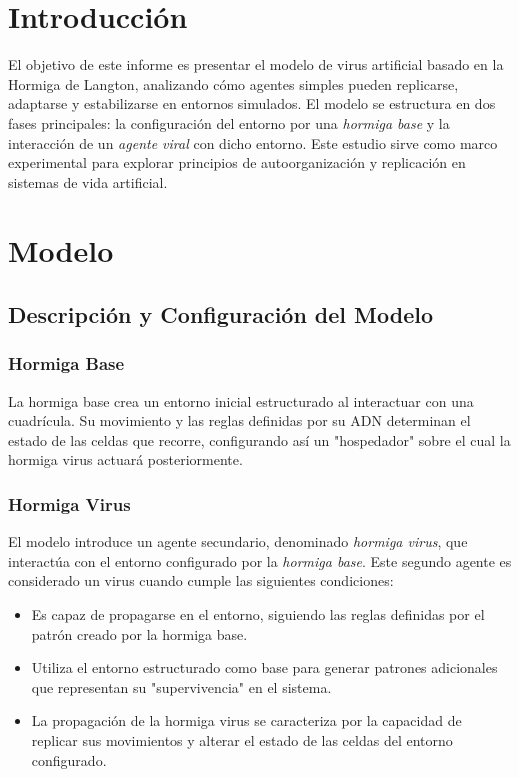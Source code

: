 \documentclass[11pt,letterpaper]{article}
\begin{document}
\begin{multicols}{2}

\section{Introducción}
El objetivo de este informe es presentar el modelo de virus artificial basado en la Hormiga de Langton, analizando cómo agentes simples pueden replicarse, adaptarse y estabilizarse en entornos simulados. El modelo se estructura en dos fases principales: la configuración del entorno por una \textit{hormiga base} y la interacción de un \textit{agente viral} con dicho entorno. Este estudio sirve como marco experimental para explorar principios de autoorganización y replicación en sistemas de vida artificial.

\section{Modelo}\label{sec:related}

\subsection{Descripción y Configuración del Modelo}

\subsubsection{Hormiga Base}
La hormiga base crea un entorno inicial estructurado al interactuar con una cuadrícula. Su movimiento y las reglas definidas por su ADN determinan el estado de las celdas que recorre, configurando así un "hospedador" sobre el cual la hormiga virus actuará posteriormente.

\subsubsection{Hormiga Virus}
El modelo introduce un agente secundario, denominado \textit{hormiga virus}, que interactúa con el entorno configurado por la \textit{hormiga base}. Este segundo agente es considerado un virus cuando cumple las siguientes condiciones:

\begin{itemize}
    \item Es capaz de propagarse en el entorno, siguiendo las reglas definidas por el patrón creado por la hormiga base.
    \item Utiliza el entorno estructurado como base para generar patrones adicionales que representan su "supervivencia" en el sistema.
    \item La propagación de la hormiga virus se caracteriza por la capacidad de replicar sus movimientos y alterar el estado de las celdas del entorno configurado.
\end{itemize}


\end{multicols}
\end{document}
